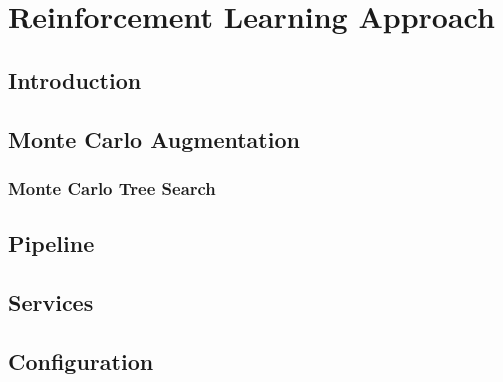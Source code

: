 \chapter{Reinforcement Learning Approach}
\section{Introduction}
\section{Monte Carlo Augmentation}
\subsection{Monte Carlo Tree Search}

\section{Pipeline}
\section{Services}
\section{Configuration}

